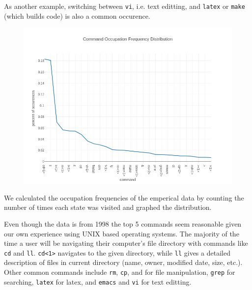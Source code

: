 \documentclass[10pt]{article}
\begin{document}
As another example, switching between \texttt{vi}, i.e. text editting, and \texttt{latex} or \texttt{make} (which builds code) is also a common occurence.

\begin{figure}[!htb]
  \centering
  \includegraphics[scale=.50]{../pictures/empirical-occ-freq-dist.png}
\end{figure}

We calculated the occupation frequencies of the emperical data by counting the number of times each state was visited and graphed the
distribution. 

Even though the data is from 1998 the top 5 commands seem reasonable given our
own experience using UNIX based operating systems. The majority of the time a
user will be navigating their computer's file directory with commands like
\texttt{cd} and \texttt{ll}. \texttt{cd<1>} navigates to the given directory,
while \texttt{ll} gives a detailed description of files in current directory (name, owner, modified date, size, etc.).
Other common commands include \texttt{rm}, \texttt{cp}, and  for file manipulation,
\texttt{grep} for searching, \texttt{latex} for latex,
and \texttt{emacs} and \texttt{vi} for text editting.
\end{document}
